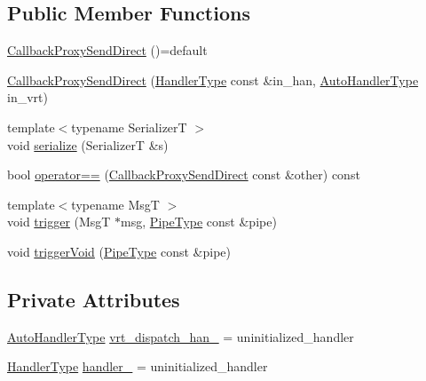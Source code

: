 \subsection*{Public Member Functions}
\begin{DoxyCompactItemize}
\item 
\hyperlink{structvt_1_1pipe_1_1callback_1_1_callback_proxy_send_direct_a9dd9c90d3e2b112d9df3c04626d6c272}{Callback\+Proxy\+Send\+Direct} ()=default
\item 
\hyperlink{structvt_1_1pipe_1_1callback_1_1_callback_proxy_send_direct_a505c5f6b4fe250a4c1f049e77271dbfe}{Callback\+Proxy\+Send\+Direct} (\hyperlink{namespacevt_af64846b57dfcaf104da3ef6967917573}{Handler\+Type} const \&in\+\_\+han, \hyperlink{structvt_1_1pipe_1_1callback_1_1_callback_proxy_send_direct_adbd70e6c1d6b374083e5d0babdcab07e}{Auto\+Handler\+Type} in\+\_\+vrt)
\item 
{\footnotesize template$<$typename SerializerT $>$ }\\void \hyperlink{structvt_1_1pipe_1_1callback_1_1_callback_proxy_send_direct_a1a64835cb030af898ad2beaec56d7887}{serialize} (SerializerT \&s)
\item 
bool \hyperlink{structvt_1_1pipe_1_1callback_1_1_callback_proxy_send_direct_a8ccc6351627fe71b4ca82d2ce2a5a7c1}{operator==} (\hyperlink{structvt_1_1pipe_1_1callback_1_1_callback_proxy_send_direct}{Callback\+Proxy\+Send\+Direct} const \&other) const
\item 
{\footnotesize template$<$typename MsgT $>$ }\\void \hyperlink{structvt_1_1pipe_1_1callback_1_1_callback_proxy_send_direct_a17ec0811bb79213d0b99c7f7bcfa697d}{trigger} (MsgT $\ast$msg, \hyperlink{namespacevt_ac9852acda74d1896f48f406cd72c7bd3}{Pipe\+Type} const \&pipe)
\item 
void \hyperlink{structvt_1_1pipe_1_1callback_1_1_callback_proxy_send_direct_a76e8f94a55e1855087d149a498953492}{trigger\+Void} (\hyperlink{namespacevt_ac9852acda74d1896f48f406cd72c7bd3}{Pipe\+Type} const \&pipe)
\end{DoxyCompactItemize}
\subsection*{Private Attributes}
\begin{DoxyCompactItemize}
\item 
\hyperlink{structvt_1_1pipe_1_1callback_1_1_callback_proxy_send_direct_adbd70e6c1d6b374083e5d0babdcab07e}{Auto\+Handler\+Type} \hyperlink{structvt_1_1pipe_1_1callback_1_1_callback_proxy_send_direct_a665d0e3eddc6aecea9112457ae96dae4}{vrt\+\_\+dispatch\+\_\+han\+\_\+} = uninitialized\+\_\+handler
\item 
\hyperlink{namespacevt_af64846b57dfcaf104da3ef6967917573}{Handler\+Type} \hyperlink{structvt_1_1pipe_1_1callback_1_1_callback_proxy_send_direct_a812b76a919292c66abd4ad0326011129}{handler\+\_\+} = uninitialized\+\_\+handler
\end{DoxyCompactItemize}


